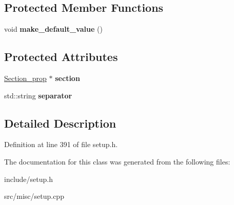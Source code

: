 \subsection*{Protected Member Functions}
\begin{DoxyCompactItemize}
\item 
\hypertarget{classProp__multival_a0a894a156a00f00d82f119a415619498}{void {\bfseries make\-\_\-default\-\_\-value} ()}\label{classProp__multival_a0a894a156a00f00d82f119a415619498}

\end{DoxyCompactItemize}
\subsection*{Protected Attributes}
\begin{DoxyCompactItemize}
\item 
\hypertarget{classProp__multival_a81ace37ba9062aea3513ddb30ccba50d}{\hyperlink{classSection__prop}{Section\-\_\-prop} $\ast$ {\bfseries section}}\label{classProp__multival_a81ace37ba9062aea3513ddb30ccba50d}

\item 
\hypertarget{classProp__multival_ab7f4e11117e972a1a1fcc718bd52201a}{std\-::string {\bfseries separator}}\label{classProp__multival_ab7f4e11117e972a1a1fcc718bd52201a}

\end{DoxyCompactItemize}


\subsection{Detailed Description}


Definition at line 391 of file setup.\-h.



The documentation for this class was generated from the following files\-:\begin{DoxyCompactItemize}
\item 
include/setup.\-h\item 
src/misc/setup.\-cpp\end{DoxyCompactItemize}
